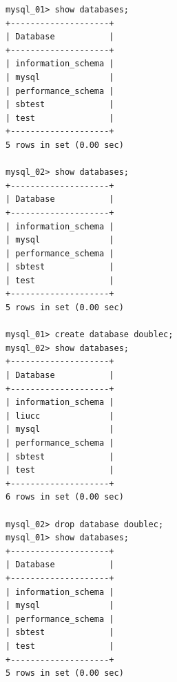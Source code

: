 \begin{verbatim}
mysql_01> show databases;
+--------------------+
| Database           |
+--------------------+
| information_schema |
| mysql              |
| performance_schema |
| sbtest             |
| test               |
+--------------------+
5 rows in set (0.00 sec)

mysql_02> show databases;
+--------------------+
| Database           |
+--------------------+
| information_schema |
| mysql              |
| performance_schema |
| sbtest             |
| test               |
+--------------------+
5 rows in set (0.00 sec)

mysql_01> create database doublec;
mysql_02> show databases;
+--------------------+
| Database           |
+--------------------+
| information_schema |
| liucc              |
| mysql              |
| performance_schema |
| sbtest             |
| test               |
+--------------------+
6 rows in set (0.00 sec)

mysql_02> drop database doublec;
mysql_01> show databases;
+--------------------+
| Database           |
+--------------------+
| information_schema |
| mysql              |
| performance_schema |
| sbtest             |
| test               |
+--------------------+
5 rows in set (0.00 sec)
\end{verbatim}

